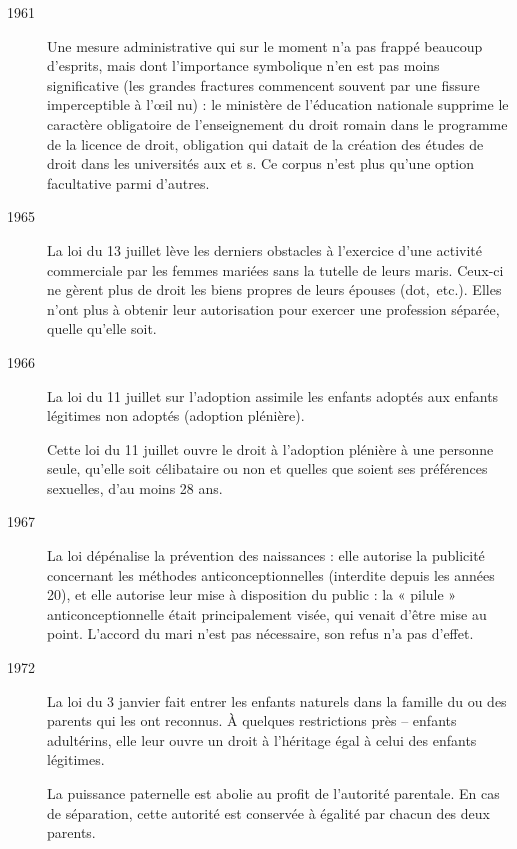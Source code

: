 \begin{description}

\item[1961] Une mesure administrative qui sur le moment n'a pas frappé beaucoup d'esprits, mais dont l'importance symbolique n'en est pas moins significative (les grandes fractures commencent souvent par une fissure imperceptible à l'œil nu) : le ministère de l'éducation nationale supprime le caractère obligatoire de l'enseignement du droit romain dans le programme de la licence de droit, obligation qui datait de la création des études de droit dans les universités aux  et s. Ce corpus n'est plus qu'une option facultative parmi d'autres. 

\item[1965] La loi du 13 juillet lève les derniers obstacles à l'exercice d'une activité commerciale par les femmes mariées sans la tutelle de leurs maris. Ceux-ci ne gèrent plus de droit les biens propres de leurs épouses (dot,~etc.). Elles n'ont plus à obtenir leur autorisation pour exercer une profession séparée, quelle qu'elle soit.

\item[1966] La loi du 11 juillet sur l'adoption assimile les enfants adoptés aux enfants légitimes non adoptés (adoption plénière). 

Cette
loi du 11 juillet ouvre le droit à l'adoption plénière à une personne seule, qu'elle soit célibataire ou non et quelles que soient ses préférences sexuelles, d'au moins 28 ans.

\item[1967] La loi  dépénalise la prévention des naissances : elle autorise la publicité concernant les méthodes anticonceptionnelles (interdite depuis les années 20), et elle autorise leur mise à disposition du public :
la « pilule » anticonceptionnelle était principalement visée,
qui venait d'être mise au point. L'accord du mari n'est pas nécessaire, son refus n'a pas d'effet.

\item[1972] La loi du 3 janvier fait entrer les enfants naturels dans la famille du ou des parents qui les ont reconnus. À quelques restrictions près -- enfants adultérins, elle leur ouvre un droit à l'héritage égal à celui des enfants légitimes.

La puissance paternelle est abolie au profit de l'autorité parentale. En cas de séparation, cette autorité est conservée à égalité par chacun des deux parents. 


\end{description}

